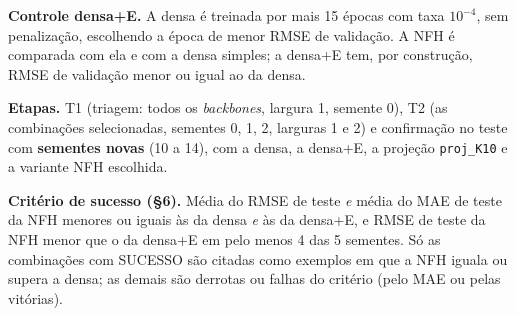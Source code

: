 \documentclass[11pt,a4paper]{article}
\begin{document}
\textbf{Controle densa+E.} A densa é treinada por mais 15 épocas com taxa $10^{-4}$, sem penalização, escolhendo a época de menor RMSE de validação. A NFH é comparada com ela e com a densa simples; a densa+E tem, por construção, RMSE de validação menor ou igual ao da densa.

\textbf{Etapas.} T1 (triagem: todos os \emph{backbones}, largura 1, semente 0), T2 (as combinações selecionadas, sementes 0, 1, 2, larguras 1 e 2) e confirmação no teste com \textbf{sementes novas} (10 a 14), com a densa, a densa+E, a projeção \texttt{proj\_K10} e a variante NFH escolhida.

\textbf{Critério de sucesso (\S{}6).} Média do RMSE de teste \emph{e} média do MAE de teste da NFH menores ou iguais às da densa \emph{e} às da densa+E, e RMSE de teste da NFH menor que o da densa+E em pelo menos 4 das 5 sementes. Só as combinações com SUCESSO são citadas como exemplos em que a NFH iguala ou supera a densa; as demais são derrotas ou falhas do critério (pelo MAE ou pelas vitórias).
\end{document}
